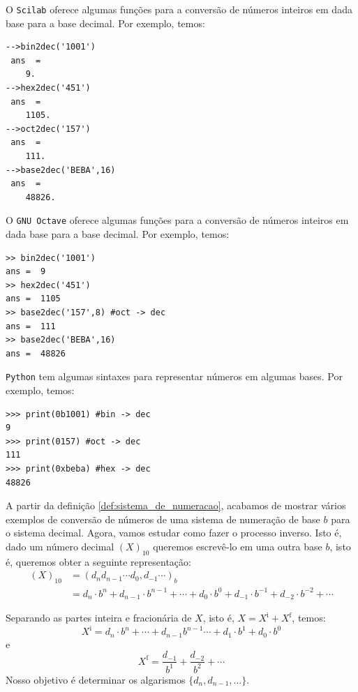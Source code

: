 \ifisscilab
\begin{obs}
  O \verb+Scilab+ oferece algumas funções para a conversão de números inteiros em dada base para a base decimal. Por exemplo, temos:
\begin{verbatim}
-->bin2dec('1001')
 ans  =
    9.  
-->hex2dec('451')
 ans  =
    1105.  
-->oct2dec('157')
 ans  =
    111.
-->base2dec('BEBA',16)
 ans  =
    48826.  
\end{verbatim}
\end{obs}
\fi
\ifisoctave
\begin{obs}
  O \verb+GNU Octave+ oferece algumas funções para a conversão de números inteiros em dada base para a base decimal. Por exemplo, temos:
\begin{verbatim}
>> bin2dec('1001')
ans =  9
>> hex2dec('451')
ans =  1105
>> base2dec('157',8) #oct -> dec
ans =  111
>> base2dec('BEBA',16)
ans =  48826
\end{verbatim}
\end{obs}
\fi
\ifispython
\begin{obs}
  \verb+Python+ tem algumas sintaxes para representar números em algumas bases. Por exemplo, temos:
\begin{verbatim}
>>> print(0b1001) #bin -> dec
9
>>> print(0157) #oct -> dec
111
>>> print(0xbeba) #hex -> dec
48826
\end{verbatim}
\end{obs}
\fi

A partir da definição \ref{def:sistema_de_numeracao}, acabamos de mostrar vários exemplos de conversão de números de uma sistema de numeração de base $b$ para o sistema decimal. Agora, vamos estudar como fazer o processo inverso. Isto é, dado um número decimal $(X)_{10}$ queremos escrevê-lo em uma outra base $b$, isto é, queremos obter a seguinte representação:
\begin{equation*}
  \begin{split}
    (X)_{10} &= (d_nd_{n-1}\cdots d_0,d_{-1}\cdots)_{b} \\
    &= d_n\cdot b^{n}+d_{n-1}\cdot b^{n-1}+\cdots + d_0\cdot b^0+d_{-1}\cdot b^{-1}+d_{-2}\cdot b^{-2}+\cdots          
  \end{split}
\end{equation*}

Separando as partes inteira e fracionária de $X$, isto é, $X = X^{\mbox{i}} + X^{\mbox{f}}$, temos:
\begin{equation*}
X^{\mbox{i}} = d_n\cdot b^{n}+ \cdots+d_{n-1}b^{n-1} \cdots  +d_1\cdot b^1 +d_0\cdot b^0
\end{equation*}
e
\begin{equation*}
  X^{\mbox{f}} = \frac{d_{-1}}{b^1} + \frac{d_{-2}}{b^{2}} + \cdots
\end{equation*}
Nosso objetivo é determinar os algarismos $\{d_n, d_{n-1}, ...\}$. 


